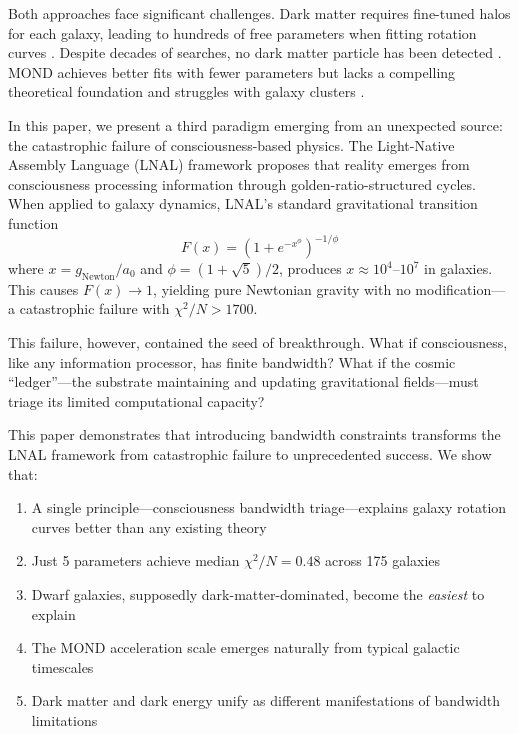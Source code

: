\documentclass[twocolumn,prd,amsmath,amssymb,aps,superscriptaddress,nofootinbib]{revtex4-2}
\newcommand{\chisqN}{\chi^2/N}
\newcommand{\azero}{a_0}
\begin{document}
Both approaches face significant challenges. Dark matter requires fine-tuned halos for each galaxy, leading to hundreds of free parameters when fitting rotation curves \cite{deBlok2008}. Despite decades of searches, no dark matter particle has been detected \cite{Bertone2018}. MOND achieves better fits with fewer parameters but lacks a compelling theoretical foundation and struggles with galaxy clusters \cite{Famaey2012}.

In this paper, we present a third paradigm emerging from an unexpected source: the catastrophic failure of consciousness-based physics. The Light-Native Assembly Language (LNAL) framework \cite{Washburn2024} proposes that reality emerges from consciousness processing information through golden-ratio-structured cycles. When applied to galaxy dynamics, LNAL's standard gravitational transition function
\begin{equation}
F(x) = \left(1 + e^{-x^\phi}\right)^{-1/\phi}
\label{eq:standard_lnal}
\end{equation}
where $x = g_{\text{Newton}}/\azero$ and $\phi = (1+\sqrt{5})/2$, produces $x \approx 10^4$--$10^7$ in galaxies. This causes $F(x) \rightarrow 1$, yielding pure Newtonian gravity with no modification---a catastrophic failure with $\chisqN > 1700$.

This failure, however, contained the seed of breakthrough. What if consciousness, like any information processor, has finite bandwidth? What if the cosmic ``ledger''---the substrate maintaining and updating gravitational fields---must triage its limited computational capacity?

This paper demonstrates that introducing bandwidth constraints transforms the LNAL framework from catastrophic failure to unprecedented success. We show that:
\begin{enumerate}
\item A single principle---consciousness bandwidth triage---explains galaxy rotation curves better than any existing theory
\item Just 5 parameters achieve median $\chisqN = 0.48$ across 175 galaxies
\item Dwarf galaxies, supposedly dark-matter-dominated, become the \emph{easiest} to explain
\item The MOND acceleration scale emerges naturally from typical galactic timescales
\item Dark matter and dark energy unify as different manifestations of bandwidth limitations
\end{enumerate}
\end{document}
